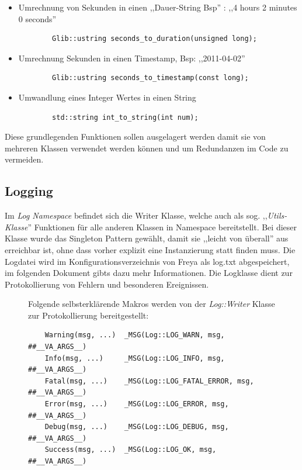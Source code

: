 \begin{itemize}
    \item Umrechnung von Sekunden in einen ,,Dauer-String Bsp'' : ,,4 hours 2 minutes 0 seconds''

        \begin{verbatim}
        Glib::ustring seconds_to_duration(unsigned long);
        \end{verbatim}

    \item Umrechnung Sekunden in einen Timestamp, Bsp: ,,2011-04-02''
        \begin{verbatim}
        Glib::ustring seconds_to_timestamp(const long);
        \end{verbatim}

    \item Umwandlung eines Integer Wertes in einen String
        \begin{verbatim}
        std::string int_to_string(int num);
        \end{verbatim}
\end{itemize}


Diese grundlegenden Funktionen sollen ausgelagert werden damit sie von mehreren Klassen verwendet werden können und um Redundanzen im 
Code zu vermeiden.

\subsection{Logging}

Im \emph{Log Namespace} befindet sich die Writer Klasse, welche auch als sog. ,,\textit{Utils-Klasse}'' Funktionen für alle anderen
Klassen in Namespace bereitstellt. Bei dieser Klasse wurde das Singleton Pattern gewählt, damit sie ,,leicht von überall'' aus erreichbar ist, ohne dass vorher explizit eine Instanzierung statt finden muss. Die Logdatei wird im Konfigurationsverzeichnis von Freya als log.txt
abgespeichert, im folgenden Dokument gibts dazu mehr Informationen. 
Die Logklasse dient zur Protokollierung von Fehlern und besonderen Ereignissen.  

\begin{figure}[htb!]
    Folgende selbsterklärende Makros werden von der \emph{Log::Writer} Klasse zur Protokollierung bereitgestellt:

    \begin{verbatim}
    Warning(msg, ...)  _MSG(Log::LOG_WARN, msg, ##__VA_ARGS__)
    Info(msg, ...)     _MSG(Log::LOG_INFO, msg, ##__VA_ARGS__)
    Fatal(msg, ...)    _MSG(Log::LOG_FATAL_ERROR, msg, ##__VA_ARGS__)
    Error(msg, ...)    _MSG(Log::LOG_ERROR, msg, ##__VA_ARGS__)
    Debug(msg, ...)    _MSG(Log::LOG_DEBUG, msg, ##__VA_ARGS__)
    Success(msg, ...)  _MSG(Log::LOG_OK, msg, ##__VA_ARGS__)
    \end{verbatim}
\end{figure}

